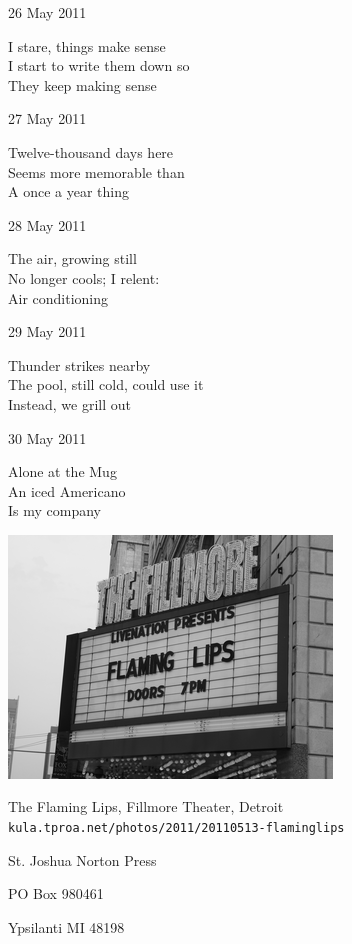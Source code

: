 \documentclass[12pt]{article}
\begin{document}
26 May 2011

I stare, things make sense \\
I start to write them down so \\
They keep making sense

27 May 2011

Twelve-thousand days here \\
Seems more memorable than \\
A once a year thing

28 May 2011

The air, growing still \\
No longer cools; I relent: \\
Air conditioning

29 May 2011

Thunder strikes nearby \\
The pool, still cold, could use it \\
Instead, we grill out

30 May 2011

Alone at the Mug \\
An iced Americano \\
Is my company


\newpage

\begin{center}
\includegraphics{lips.png}

The Flaming Lips, Fillmore Theater, Detroit \\
{\tt kula.tproa.net/photos/2011/20110513-flaminglips }
\end{center}



\newpage

\thispagestyle{empty}
\vspace*{12cm}
\begin{sideways}
\Large{St. Joshua Norton Press}
\end{sideways}
\begin{sideways}
\Large{PO Box 980461}
\end{sideways}
\begin{sideways}
\Large{Ypsilanti MI 48198}
\end{sideways}
\end{document}
